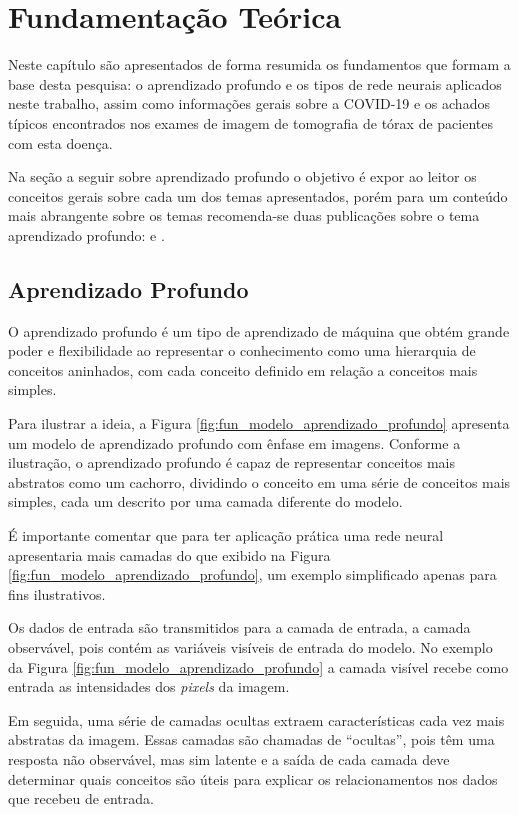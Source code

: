 \chapter{Fundamentação Teórica} \label{cap:cap_fundamentos}

Neste capítulo são apresentados de forma resumida os fundamentos que formam a base desta pesquisa: o aprendizado profundo e os tipos de rede neurais aplicados neste trabalho, assim como informações gerais sobre a COVID-19 e os achados típicos encontrados nos exames de imagem de tomografia de tórax de pacientes com esta doença.

Na seção a seguir sobre aprendizado profundo o objetivo é  expor ao leitor os conceitos gerais sobre cada um dos temas apresentados, porém para um conteúdo mais abrangente sobre os temas recomenda-se duas publicações sobre o tema aprendizado profundo: \cite{goodfellow2016deep} e \cite{zhang2020dive}.

\section{Aprendizado Profundo}\label{section:cap_fundamentos_dl}

O aprendizado profundo \cite{goodfellow2016deep} é um tipo de aprendizado de máquina que obtém grande poder e flexibilidade ao representar o conhecimento como uma hierarquia de conceitos aninhados, com cada conceito definido em relação a conceitos mais simples.

Para ilustrar a ideia, a Figura \ref{fig:fun_modelo_aprendizado_profundo} apresenta um modelo de aprendizado profundo com ênfase em imagens. Conforme a ilustração, o aprendizado profundo é capaz de representar conceitos mais abstratos como um cachorro, dividindo o conceito em uma série de conceitos mais simples, cada um descrito por uma camada diferente do modelo. 

É importante comentar que para ter aplicação prática uma rede neural apresentaria mais camadas do que exibido na Figura \ref{fig:fun_modelo_aprendizado_profundo}, um exemplo simplificado apenas para fins ilustrativos. 

Os dados de entrada são transmitidos para a camada de entrada, a camada observável, pois contém as variáveis visíveis de entrada do modelo. No exemplo da Figura \ref{fig:fun_modelo_aprendizado_profundo} a camada visível recebe como entrada as intensidades dos \textit{pixels} da imagem.

Em seguida, uma série de camadas ocultas extraem características cada vez mais abstratas da imagem. Essas camadas são chamadas de “ocultas”, pois têm uma resposta não observável, mas sim latente e a saída de cada camada deve determinar quais conceitos são úteis para explicar os relacionamentos nos dados que recebeu de entrada.

